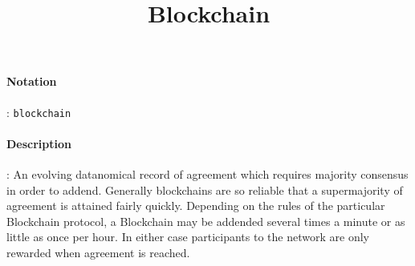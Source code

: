 \documentclass[10pt,a4paper,oneside]{scrartcl}
\author{}
\title{Blockchain}
\date{}
\begin{document}
\maketitle
\paragraph{Notation}: \texttt{blockchain} %
\paragraph{Description}: An evolving datanomical record of agreement which requires majority consensus in order to addend. Generally blockchains are so reliable that a supermajority of agreement is attained fairly quickly. Depending on the rules of the particular Blockchain protocol, a Blockchain may be addended several times a minute or as little as once per hour. In either case participants to the network are only rewarded when agreement is reached. 
\end{document}
